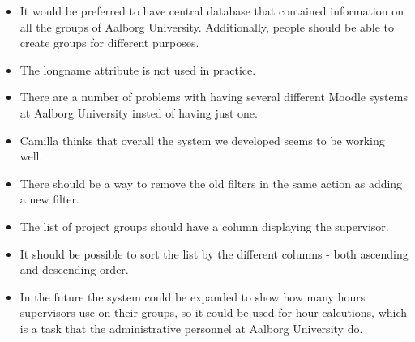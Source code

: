 \begin{itemize}
	\item It would be preferred to have central database that contained information on all the groups of Aalborg University.
Additionally, people should be able to create groups for different purposes.
  \item The longname attribute is not used in practice.
	\item There are a number of problems with having several different Moodle systems at Aalborg University insted of having just one.
	\item Camilla thinks that overall the system we developed seems to be working well.
	\item There should be a way to remove the old filters in the same action as adding a new filter.
	\item The list of project groups should have a column displaying the supervisor.
	\item It should be possible to sort the list by the different columns - both ascending and descending order.
	\item In the future the system could be expanded to show how many hours supervisors use on their groups, so it could be used for hour calcutions, which is a task that the administrative personnel at Aalborg University do.
\end{itemize}